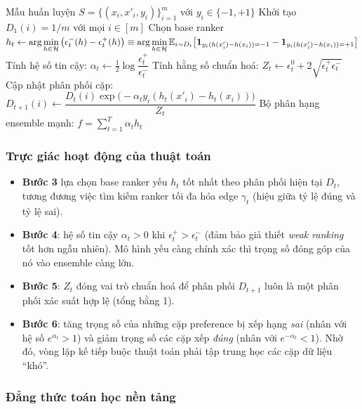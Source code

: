 \begin{algorithm}[H]
\caption{RankBoost}
\label{alg:rankboost}
\begin{algorithmic}[1]
\REQUIRE Mẫu huấn luyện $S = \{(x_i, x'_i, y_i)\}_{i=1}^m$ với $y_i \in \{-1, +1\}$
\STATE Khởi tạo $D_1(i) = 1/m$ với mọi $i \in [m]$
    \STATE Chọn base ranker $h_t \leftarrow \displaystyle\arg\min_{h \in \mathcal{H}} \left( \epsilon^-_t(h) - \epsilon^+_t(h) \right) \equiv \displaystyle\arg\min_{h \in \mathcal{H}} \mathbb{E}_{i \sim D_t}\bigl[\mathbf{1}_{y_i(h(x'_i)-h(x_i)) = -1} - \mathbf{1}_{y_i(h(x'_i)-h(x_i)) = +1}\bigr]$
    \STATE Tính hệ số tin cậy: $\alpha_t \leftarrow \frac{1}{2}\log\dfrac{\epsilon^+_t}{\epsilon^-_t}$
    \STATE Tính hằng số chuẩn hoá: $Z_t \leftarrow \epsilon^0_t + 2\sqrt{\epsilon^+_t \epsilon^-_t}$
    \STATE Cập nhật phân phối cặp: $D_{t+1}(i) \leftarrow \dfrac{D_t(i) \exp\bigl(-\alpha_t y_i(h_t(x'_i)-h_t(x_i))\bigr)}{Z_t}$
\ENDFOR
\RETURN Bộ phân hạng ensemble mạnh: $f = \sum_{t=1}^T \alpha_t h_t$
\end{algorithmic}
\end{algorithm}

\subsubsection{Trực giác hoạt động của thuật toán}

\begin{itemize}
    \item \textbf{Bước 3} lựa chọn base ranker yếu $h_t$ tốt nhất theo phân phối hiện tại $D_t$, tương đương việc tìm kiếm ranker tối đa hóa edge $\gamma_t$ (hiệu giữa tỷ lệ đúng và tỷ lệ sai).
    \item \textbf{Bước 4}: hệ số tin cậy $\alpha_t > 0$ khi $\epsilon^+_t > \epsilon^-_t$ (đảm bảo giả thiết \textit{weak ranking} tốt hơn ngẫu nhiên). Mô hình yếu càng chính xác thì trọng số đóng góp của nó vào ensemble càng lớn.
    \item \textbf{Bước 5}: $Z_t$ đóng vai trò chuẩn hoá để phân phối $D_{t+1}$ luôn là một phân phối xác suất hợp lệ (tổng bằng 1).
    \item \textbf{Bước 6}: tăng trọng số của những cặp preference bị xếp hạng \textit{sai} (nhân với hệ số $e^{\alpha_t} > 1$) và giảm trọng số các cặp xếp \textit{đúng} (nhân với $e^{-\alpha_t} < 1$). Nhờ đó, vòng lặp kế tiếp buộc thuật toán phải tập trung học các cặp dữ liệu ``khó''.
\end{itemize}

\subsubsection{Đẳng thức toán học nền tảng}

